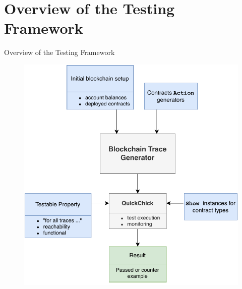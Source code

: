 \section{Overview of the Testing Framework}
\begin{frame}{Overview of the Testing Framework}
\begin{figure}
\includegraphics[scale=0.64]{media/testing-framework.pdf}
\end{figure}
\end{frame}

